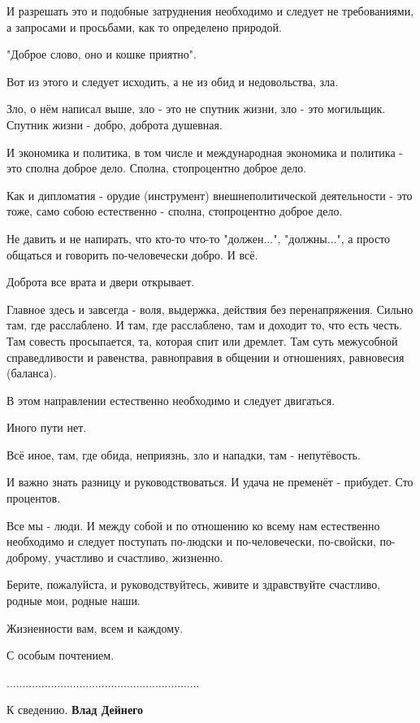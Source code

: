 \begin{itemize}
И разрешать это и подобные затруднения необходимо и следует не требованиями, а
запросами и просьбами, как то определено природой.

"Доброе слово, оно и кошке приятно".

Вот из этого и следует исходить, а не из обид и недовольства, зла.

Зло, о нём написал выше, зло - это не спутник жизни, зло - это могильщик.
Спутник жизни - добро, доброта душевная.

И экономика и политика, в том числе и международная экономика и политика - это
сполна доброе дело. Сполна, стопроцентно доброе дело.

Как и дипломатия - орудие (инструмент) внешнеполитической деятельности - это
тоже, само собою естественно - сполна, стопроцентно доброе дело.

Не давить и не напирать, что кто-то что-то "должен...", "должны...", а просто
общаться и говорить по-человечески добро. И всё.

Доброта все врата и двери открывает.

Главное здесь и завсегда - воля, выдержка, действия без перенапряжения. Сильно
там, где расслаблено. И там, где расслаблено, там и доходит то, что есть честь.
Там совесть просыпается, та, которая спит или дремлет. Там суть межусобной
справедливости и равенства, равноправия в общении и отношениях, равновесия
(баланса).

В этом направлении естественно необходимо и следует двигаться.

Иного пути нет.

Всё иное, там, где обида, неприязнь, зло и нападки, там - непутёвость.

И важно знать разницу и руководствоваться. И удача не пременёт - прибудет. Сто
процентов.

Все мы - люди. И между собой и по отношению ко всему нам естественно необходимо
и следует поступать по-людски и по-человечески, по-свойски, по-доброму,
участливо и счастливо, жизненно.

Берите, пожалуйста, и руководствуйтесь, живите и здравствуйте счастливо, родные
мои, родные наши.

Жизненности вам, всем и каждому.

С особым почтением.

.............................................................

К сведению. \textbf{Влад Дейнего}

\end{itemize} %
